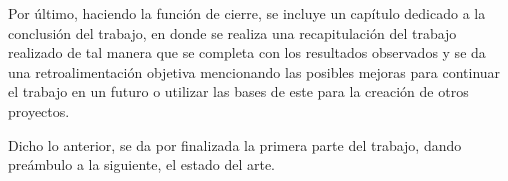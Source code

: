 Por último, haciendo la función de cierre, se incluye un capítulo dedicado a la conclusión del trabajo, en donde se realiza una recapitulación del trabajo realizado de tal manera que se completa con los resultados observados y se da una retroalimentación objetiva mencionando las posibles mejoras para continuar el trabajo en un futuro o utilizar las bases de este para la creación de otros proyectos.

Dicho lo anterior, se da por finalizada la primera parte del trabajo, dando preámbulo a la siguiente, el estado del arte.